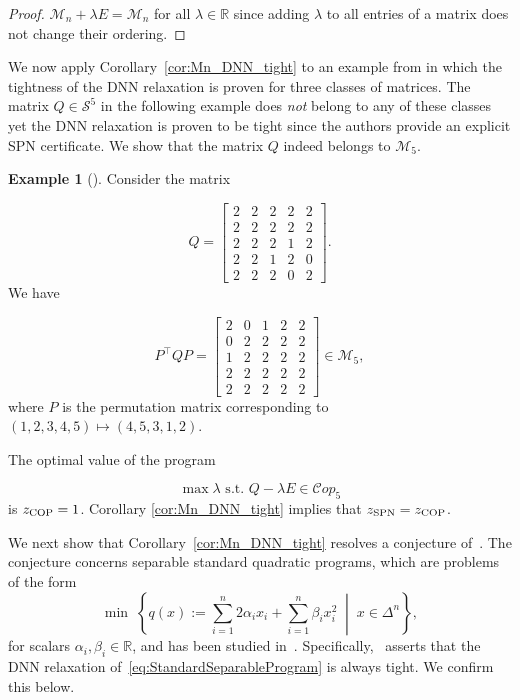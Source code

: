 \documentclass{amsart}
\newcommand{\bbR}{\mathbb{R}}
\newcommand{\cM}{\mathcal{M}}
\newcommand{\Cop}{\mathcal{C}op}
\theoremstyle{definition}
\newtheorem{example}[theorem]{Example}
\begin{document}
\begin{proof}
$\cM_n + \lambda E = \cM_n$ for all $\lambda \in \bbR$ since adding $\lambda$ to all entries of a matrix does not change their ordering. 

\end{proof}


We now apply Corollary~\ref{cor:Mn_DNN_tight} to an example from
 \cite{gokmen2022standard} in which
 the tightness of the DNN relaxation is proven for three classes of matrices.  The matrix $Q\in\mathcal{S}^5$ in the following example does \textit{not}  belong to any of these classes yet  the DNN relaxation is proven to be tight since the authors provide an explicit SPN certificate. We show that the matrix $Q$ indeed belongs to $\mathcal{M}_5$.
\begin{example}[{\cite[Example 4]{gokmen2022standard}}]\label{ex:Extraneous1}
Consider the matrix 

\[Q = \begin{bmatrix}2 & 2 & 2 & 2 & 2\\ 2 & 2 & 2 & 2 & 2\\  2&2&2&1&2\\ 2&2&1&2&0\\2&2&2&0&2\end{bmatrix}.\]
%
We have 

\[P^{\top}QP = \begin{bmatrix}2 & 0 & 1 & 2 & 2\\ 0 & 2 & 2 & 2 & 2\\ 1 & 2 & 2 & 2 & 2\\ 2 & 2 & 2 & 2 & 2\\ 2 & 2 & 2 & 2 & 2 \end{bmatrix} \in \cM_5,\]
%
where $P$ is the permutation matrix corresponding to $(1,2,3,4,5)\mapsto (4,5,3,1,2)$.

The optimal value of the program 

\[\max \lambda \text{ s.t. } Q - \lambda E \in \Cop_5\]
%
is $z_{\textup{COP}} = 1$.  Corollary \ref{cor:Mn_DNN_tight} implies that $z_{\textup{SPN}} = z_{\textup{COP}}$.
\end{example}


We next show that Corollary~\ref{cor:Mn_DNN_tight} resolves a conjecture of~\cite{dey_convexification_2025-1}. The conjecture concerns separable standard quadratic programs, which are problems of the form
\begin{equation}\label{eq:StandardSeparableProgram}
\min \;  \left\{q(x) := \sum_{i=1}^{n} 2\alpha_i x_i + \sum_{i=1}^{n} \beta_i x_i^2 \;\middle  \vert\; x \in \Delta^n \right\},
\end{equation}
for scalars $\alpha_i, \beta_i \in \bbR$, and has been studied in~\cite{bomze_separable_2012, dey_convexification_2025-1}. Specifically,~\cite[Conjecture 1]{dey_convexification_2025-1} asserts that the DNN relaxation of~\eqref{eq:StandardSeparableProgram} is always tight. We confirm this below.
\end{document}
